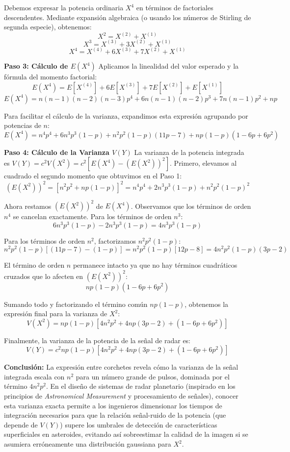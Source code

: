 Debemos expresar la potencia ordinaria $X^4$ en términos de factoriales descendentes. Mediante expansión algebraica (o usando los números de Stirling de segunda especie), obtenemos:
$$ X^2 = X^{(2)} + X^{(1)} $$
$$ X^3 = X^{(3)} + 3X^{(2)} + X^{(1)} $$
$$ X^4 = X^{(4)} + 6X^{(3)} + 7X^{(2)} + X^{(1)} $$

\textbf{Paso 3: Cálculo de $E(X^4)$}
Aplicamos la linealidad del valor esperado y la fórmula del momento factorial:
$$ E(X^4) = E[X^{(4)}] + 6E[X^{(3)}] + 7E[X^{(2)}] + E[X^{(1)}] $$
$$ E(X^4) = n(n-1)(n-2)(n-3)p^4 + 6n(n-1)(n-2)p^3 + 7n(n-1)p^2 + np $$

Para facilitar el cálculo de la varianza, expandimos esta expresión agrupando por potencias de $n$:
$$ E(X^4) = n^4p^4 + 6n^3p^3(1-p) + n^2p^2(1-p)(11p-7) + np(1-p)(1-6p+6p^2) $$

\textbf{Paso 4: Cálculo de la Varianza $V(Y)$}
La varianza de la potencia integrada es $V(Y) = c^2 V(X^2) = c^2 [E(X^4) - (E(X^2))^2]$.
Primero, elevamos al cuadrado el segundo momento que obtuvimos en el Paso 1:
$$ (E(X^2))^2 = [n^2p^2 + np(1-p)]^2 = n^4p^4 + 2n^3p^3(1-p) + n^2p^2(1-p)^2 $$

Ahora restamos $(E(X^2))^2$ de $E(X^4)$. Observamos que los términos de orden $n^4$ se cancelan exactamente. Para los términos de orden $n^3$:
$$ 6n^3p^3(1-p) - 2n^3p^3(1-p) = 4n^3p^3(1-p) $$

Para los términos de orden $n^2$, factorizamos $n^2p^2(1-p)$:
$$ n^2p^2(1-p) [ (11p - 7) - (1-p) ] = n^2p^2(1-p) [ 12p - 8 ] = 4n^2p^2(1-p)(3p-2) $$

El término de orden $n$ permanece intacto ya que no hay términos cuadráticos cruzados que lo afecten en $(E(X^2))^2$:
$$ np(1-p)(1-6p+6p^2) $$

Sumando todo y factorizando el término común $np(1-p)$, obtenemos la expresión final para la varianza de $X^2$:
$$ V(X^2) = np(1-p) \left[ 4n^2p^2 + 4np(3p-2) + (1-6p+6p^2) \right] $$

Finalmente, la varianza de la potencia de la señal de radar es:
$$ V(Y) = c^2 np(1-p) \left[ 4n^2p^2 + 4np(3p-2) + (1-6p+6p^2) \right] $$

\textbf{Conclusión:}
La expresión entre corchetes revela cómo la varianza de la señal integrada escala con $n^2$ para un número grande de pulsos, dominada por el término $4n^2p^2$. En el diseño de sistemas de radar planetario (inspirado en los principios de \textit{Astronomical Measurement} y procesamiento de señales), conocer esta varianza exacta permite a los ingenieros dimensionar los tiempos de integración necesarios para que la relación señal-ruido de la potencia (que depende de $V(Y)$) supere los umbrales de detección de características superficiales en asteroides, evitando así sobreestimar la calidad de la imagen si se asumiera erróneamente una distribución gaussiana para $X^2$.


